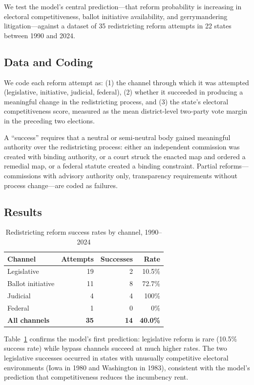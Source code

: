 We test the model's central prediction---that reform probability is increasing in electoral competitiveness, ballot initiative availability, and gerrymandering litigation---against a dataset of 35 redistricting reform attempts in 22 states between 1990 and 2024.

\subsection{Data and Coding}

We code each reform attempt as: (1) the channel through which it was attempted (legislative, initiative, judicial, federal), (2) whether it succeeded in producing a meaningful change in the redistricting process, and (3) the state's electoral competitiveness score, measured as the mean district-level two-party vote margin in the preceding two elections.

A ``success'' requires that a neutral or semi-neutral body gained meaningful authority over the redistricting process: either an independent commission was created with binding authority, or a court struck the enacted map and ordered a remedial map, or a federal statute created a binding constraint. Partial reforms---commissions with advisory authority only, transparency requirements without process change---are coded as failures.

\subsection{Results}

\begin{table}[h]
\centering
\caption{Redistricting reform success rates by channel, 1990--2024}
\label{tab:reform-success}
\begin{tabular}{@{}lrrr@{}}
\toprule
Channel & Attempts & Successes & Rate \\
\midrule
Legislative         & 19 & 2  & 10.5\% \\
Ballot initiative   & 11 & 8  & 72.7\% \\
Judicial            &  4 & 4  & 100\%  \\
Federal             &  1 & 0  & 0\%    \\
\midrule
\textbf{All channels} & \textbf{35} & \textbf{14} & \textbf{40.0\%} \\
\bottomrule
\end{tabular}
\end{table}

Table~\ref{tab:reform-success} confirms the model's first prediction: legislative reform is rare (10.5\% success rate) while bypass channels succeed at much higher rates. The two legislative successes occurred in states with unusually competitive electoral environments (Iowa in 1980 and Washington in 1983), consistent with the model's prediction that competitiveness reduces the incumbency rent.

